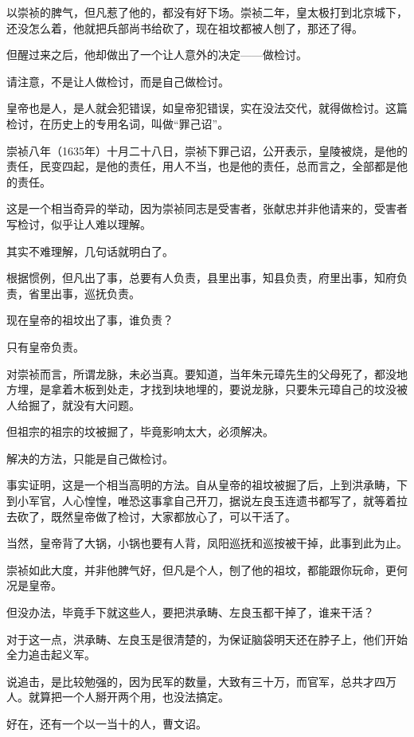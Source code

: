 \begin{multicols}{\theparacolNo}
		以崇祯的脾气，但凡惹了他的，都没有好下场。崇祯二年，皇太极打到北京城下，还没怎么着，他就把兵部尚书给砍了，现在祖坟都被人刨了，那还了得。

		但醒过来之后，他却做出了一个让人意外的决定——做检讨。

		请注意，不是让人做检讨，而是自己做检讨。

		皇帝也是人，是人就会犯错误，如皇帝犯错误，实在没法交代，就得做检讨。这篇检讨，在历史上的专用名词，叫做“罪己诏”。

		崇祯八年（1635年）十月二十八日，崇祯下罪己诏，公开表示，皇陵被烧，是他的责任，民变四起，是他的责任，用人不当，也是他的责任，总而言之，全部都是他的责任。

		这是一个相当奇异的举动，因为崇祯同志是受害者，张献忠并非他请来的，受害者写检讨，似乎让人难以理解。

		其实不难理解，几句话就明白了。

		根据惯例，但凡出了事，总要有人负责，县里出事，知县负责，府里出事，知府负责，省里出事，巡抚负责。

		现在皇帝的祖坟出了事，谁负责？

		只有皇帝负责。

		对崇祯而言，所谓龙脉，未必当真。要知道，当年朱元璋先生的父母死了，都没地方埋，是拿着木板到处走，才找到块地埋的，要说龙脉，只要朱元璋自己的坟没被人给掘了，就没有大问题。

		但祖宗的祖宗的坟被掘了，毕竟影响太大，必须解决。

		解决的方法，只能是自己做检讨。

		事实证明，这是一个相当高明的方法。自从皇帝的祖坟被掘了后，上到洪承畴，下到小军官，人心惶惶，唯恐这事拿自己开刀，据说左良玉连遗书都写了，就等着拉去砍了，既然皇帝做了检讨，大家都放心了，可以干活了。

		当然，皇帝背了大锅，小锅也要有人背，凤阳巡抚和巡按被干掉，此事到此为止。

		崇祯如此大度，并非他脾气好，但凡是个人，刨了他的祖坟，都能跟你玩命，更何况是皇帝。

		但没办法，毕竟手下就这些人，要把洪承畴、左良玉都干掉了，谁来干活？

		对于这一点，洪承畴、左良玉是很清楚的，为保证脑袋明天还在脖子上，他们开始全力追击起义军。

		说追击，是比较勉强的，因为民军的数量，大致有三十万，而官军，总共才四万人。就算把一个人掰开两个用，也没法搞定。

		好在，还有一个以一当十的人，曹文诏。
		\ifnum{}
	\end{multicols}
\fi
\newpage
